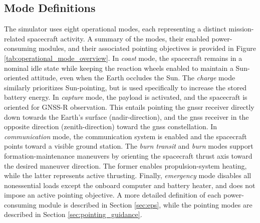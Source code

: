 \subsection{Mode Definitions}
The simulator uses eight operational modes, each representing a distinct mission-related spacecraft activity. A summary of the modes, their enabled power-consuming modules, and their associated pointing objectives is provided in Figure \ref{tab:operational_mode_overview}. In \textit{coast} mode, the spacecraft remains in a nominal idle state while keeping the reaction wheels enabled to maintain a Sun-oriented attitude, even when the Earth occludes the Sun. The \textit{charge} mode similarly prioritizes Sun-pointing, but is used specifically to increase the stored battery energy. In \textit{capture} mode, the payload is activated, and the spacecraft is oriented for GNSS-R observation. This entails pointing the \gls{gnssr} receiver directly down towards the Earth's surface (nadir-direction), and the \gls{gnss} receiver in the opposite direction (zenith-direction) toward the \gls{gnss} constellation. In \textit{communication} mode, the communication system is enabled and the spacecraft points toward a visible ground station. The \textit{burn transit} and \textit{burn} modes support formation-maintenance maneuvers by orienting the spacecraft thrust axis toward the desired maneuver direction. The former enables propulsion-system heating, while the latter represents active thrusting. Finally, \textit{emergency} mode disables all nonessential loads except the onboard computer and battery heater, and does not impose an active pointing objective. A more detailed definition of each power-consuming module is described in Section \ref{sec:eps}, while the pointing modes are described in Section \ref{sec:pointing_guidance}.

